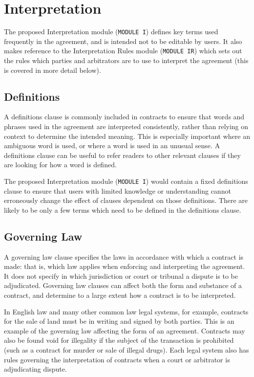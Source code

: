 \documentclass[a4paper,12pt]{article}
\begin{document}
\section{Interpretation}

The proposed Interpretation module (\texttt{MODULE I}) defines key terms used frequently in the agreement, and is intended not to be editable by users. It also makes reference to the Interpretation Rules module (\texttt{MODULE IR}) which sets out the rules which parties and arbitrators are to use to interpret the agreement (this is covered in more detail below).

\subsection{Definitions}

A definitions clause is commonly included in contracts to ensure that words and phrases used in the agreement are interpreted consistently, rather than relying on context to determine the intended meaning. This is especially important where an ambiguous word is used, or where a word is used in an unusual sense. A definitions clause can be useful to refer readers to other relevant clauses if they are looking for how a word is defined.

The proposed Interpretation module (\texttt{MODULE I}) would contain a fixed definitions clause to ensure that users with limited knowledge or understanding cannot erroneously change the effect of clauses dependent on those definitions. There are likely to be only a few terms which need to be defined in the definitions clause.

\subsection{Governing Law}

A governing law clause specifies the laws in accordance with which a contract is made: that is, which law applies when enforcing and interpreting the agreement. It does not specify in which jurisdiction or court or tribunal a dispute is to be adjudicated. Governing law clauses can affect both the form and substance of a contract, and determine to a large extent how a contract is to be interpreted.

In English law and many other common law legal systems, for example, contracts for the sale of land must be in writing and signed by both parties. This is an example of the governing law affecting the form of an agreement. Contracts may also be found void for illegality if the subject of the transaction is prohibited (such as a contract for murder or sale of illegal drugs). Each legal system also has rules governing the interpretation of contracts when a court or arbitrator is adjudicating dispute.
\end{document}
